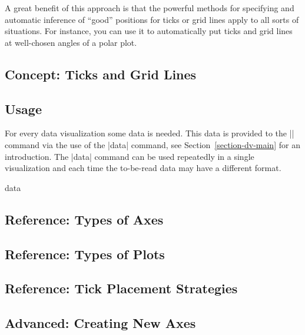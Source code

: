 A great benefit of this approach is that the powerful methods for
specifying and automatic inference of ``good'' positions for ticks or
grid lines apply to all sorts of situations. For instance, you can use
it to automatically put ticks and grid lines at well-chosen angles of
a polar plot.




\subsection{Concept: Ticks and Grid Lines}





\subsection{Usage}
\label{section-dv-data-syntax}

For every data visualization some data is needed. This data is
provided to the |\datavisualization| command via the use of the |data|
command, see Section~\ref{section-dv-main} for an introduction. The
|data| command can be used repeatedly in a single visualization and
each time the to-be-read data may have a different format.

\begin{datavisualizationoperation}{data}{}
  
\end{datavisualizationoperation}


\subsection{Reference: Types of Axes}

\subsection{Reference: Types of Plots}

\subsection{Reference: Tick Placement Strategies}

\subsection{Advanced: Creating New Axes}
